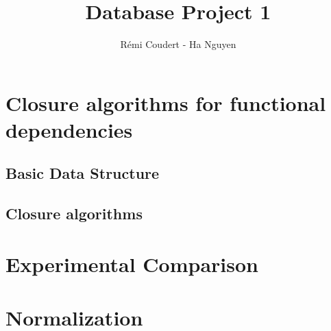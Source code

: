 \documentclass[a4paper]{article}
\title{Database Project 1}
\author{Rémi Coudert - Ha Nguyen}
\begin{document}
\maketitle

\section{Closure algorithms for functional dependencies}

\subsection{Basic Data Structure}

\subsection{Closure algorithms}

\section{Experimental Comparison}

\section{Normalization}
\end{document}
